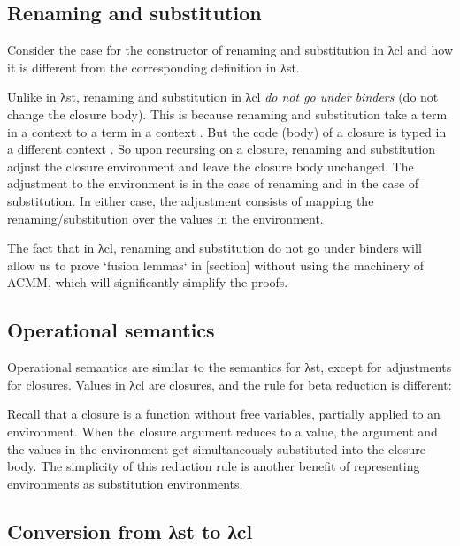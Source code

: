 \documentclass[bsc,frontabs,oneside,singlespacing,parskip,deptreport]{infthesis}
\theoremstyle{definition}
\begin{document}
\subsection{Renaming and substitution}
\label{sec:renam-subst}

Consider the case for the constructor  of renaming and
substitution in λcl and how it is different from the corresponding
definition in λst.


Unlike in λst, renaming and substitution in λcl \textit{do not go
  under binders} (do not change the closure body). This is because
renaming and substitution take a term in a context  to a term in
a context . But the code (body) of a closure is typed in a
different context . So upon recursing on a closure, renaming and
substitution adjust the closure environment and leave the closure body
unchanged. The adjustment to the environment is 
in the case of renaming and  in the case of
substitution. In either case, the adjustment consists of mapping the
renaming/substitution over the values in the environment.

The fact that in λcl, renaming and substitution do not go under
binders will allow us to prove `fusion lemmas` in [section] without
using the machinery of ACMM, which will significantly simplify the
proofs.

\subsection{Operational semantics}
\label{sec:oper-semant}

Operational semantics are similar to the semantics for λst, except for
adjustments for closures. Values in λcl are closures, and the rule for
beta reduction is different:


Recall that a closure is a function without free variables,
partially applied to an environment. When the closure argument reduces
to a value, the argument and the values in the environment get
simultaneously substituted into the closure body. The simplicity of
this reduction rule is another benefit of representing environments as
substitution environments.

\subsection{Conversion from λst to λcl}
\label{sec:conversion-from-st}
\end{document}
